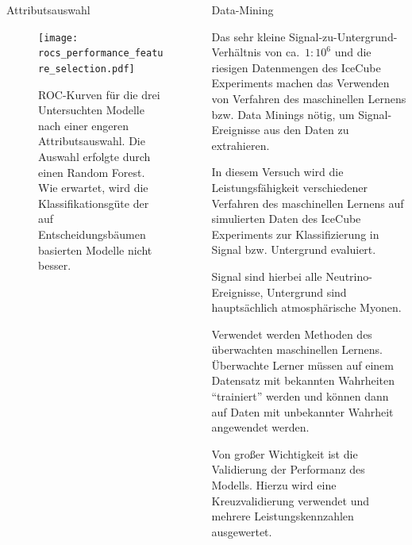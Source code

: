 \documentclass[t]{beamer}
\begin{document}
\begin{columns}[onlytextwidth]
\begin{column}{0.5\textwidth}
      \begin{block}[height=23.42cm]{Attributsauswahl}
        \begin{multicols}{2}
          \begin{figure}
            \centering
            \texttt{[image: rocs\_performance\_feature\_selection.pdf]}
            \caption{ROC-Kurven für die drei Untersuchten Modelle nach einer
              engeren Attributsauswahl. Die Auswahl erfolgte durch einen Random Forest.
              Wie erwartet, wird die Klassifikationsgüte der auf Entscheidungsbäumen basierten Modelle nicht besser.}
            \label{fig:name}
          \end{figure}
          \begin{center}
            
          \end{center}
        \end{multicols}
      \end{block}
    \end{column}%
    \begin{column}{0.5\textwidth}%
      \begin{block}{Data-Mining}%
        \begin{multicols}{2}
          Das sehr kleine Signal-zu-Untergrund-Verhältnis von ca.\ $1:10^6$ und die
          riesigen Datenmengen des IceCube Experiments machen das
          Verwenden von Verfahren des maschinellen Lernens bzw. Data Minings nötig,
          um Signal-Ereignisse aus den Daten zu extrahieren.

          In diesem Versuch wird die Leistungsfähigkeit verschiedener Verfahren
          des maschinellen Lernens auf simulierten Daten des IceCube Experiments
          zur Klassifizierung in Signal bzw. Untergrund evaluiert.

          Signal sind hierbei alle Neutrino-Ereignisse, Untergrund sind hauptsächlich
          atmosphärische Myonen.

          Verwendet werden Methoden des überwachten maschinellen Lernens.
          Überwachte Lerner müssen auf einem Datensatz mit bekannten Wahrheiten
          \enquote{trainiert} werden und können dann auf Daten mit unbekannter
          Wahrheit angewendet werden.

          Von großer Wichtigkeit ist die Validierung der Performanz des Modells.
          Hierzu wird eine Kreuzvalidierung verwendet und mehrere Leistungskennzahlen
          ausgewertet.
        \end{multicols}
      \end{block}%


\end{column}
\end{columns}
\end{document}
